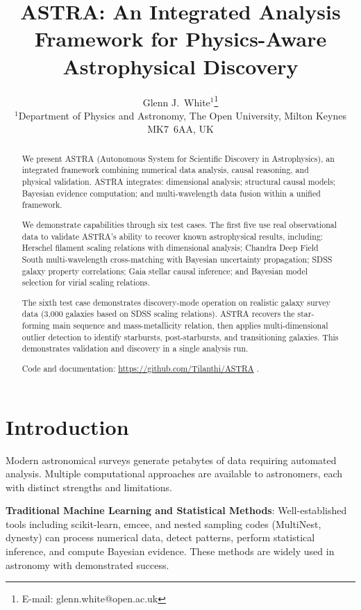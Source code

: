 \documentclass[usenatbib]{rasti}
\title[ASTRA: Integrated Analysis Framework for Astrophysics]{ASTRA: An Integrated Analysis Framework for Physics-Aware Astrophysical Discovery}
\author[White]{
Glenn J.~White$^{1}$\thanks{E-mail: glenn.white@open.ac.uk}\\
$^{1}$Department of Physics and Astronomy, The Open University, Milton Keynes MK7~6AA, UK
}
\begin{document}

\maketitle

\label{firstpage}

\begin{abstract}
We present ASTRA (Autonomous System for Scientific Discovery in Astrophysics), an integrated framework combining numerical data analysis, causal reasoning, and physical validation. ASTRA integrates: dimensional analysis; structural causal models; Bayesian evidence computation; and multi-wavelength data fusion within a unified framework.

We demonstrate capabilities through six test cases. The first five use real observational data to validate ASTRA's ability to recover known astrophysical results, including: Herschel filament scaling relations with dimensional analysis; Chandra Deep Field South multi-wavelength cross-matching with Bayesian uncertainty propagation; SDSS galaxy property correlations; Gaia stellar causal inference; and Bayesian model selection for virial scaling relations.

The sixth test case demonstrates discovery-mode operation on realistic galaxy survey data (3,000 galaxies based on SDSS scaling relations). ASTRA recovers the star-forming main sequence and mass-metallicity relation, then applies multi-dimensional outlier detection to identify starbursts, post-starbursts, and transitioning galaxies. This demonstrates validation and discovery in a single analysis run.

Code and documentation: \url{https://github.com/Tilanthi/ASTRA} \cite{astra_github}.
\end{abstract}

\section{Introduction}

Modern astronomical surveys generate petabytes of data requiring automated analysis. Multiple computational approaches are available to astronomers, each with distinct strengths and limitations.

\textbf{Traditional Machine Learning and Statistical Methods}: Well-established tools including scikit-learn, emcee, and nested sampling codes (MultiNest, dynesty) can process numerical data, detect patterns, perform statistical inference, and compute Bayesian evidence. These methods are widely used in astronomy with demonstrated success.
\end{document}
